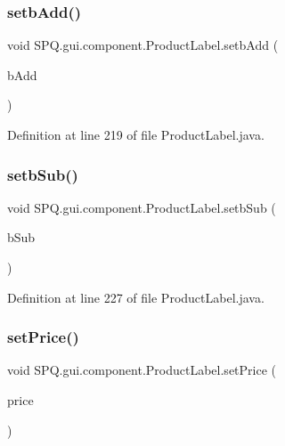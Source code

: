 \subsubsection{\texorpdfstring{setb\+Add()}{setbAdd()}}
{\footnotesize\ttfamily void S\+P\+Q.\+gui.\+component.\+Product\+Label.\+setb\+Add (\begin{DoxyParamCaption}\item[{J\+Button}]{b\+Add }\end{DoxyParamCaption})}



Definition at line 219 of file Product\+Label.\+java.

\mbox{\label{class_s_p_q_1_1gui_1_1component_1_1_product_label_a1d3899db7326042feaa04a482a86ee8e}} 
\subsubsection{\texorpdfstring{setb\+Sub()}{setbSub()}}
{\footnotesize\ttfamily void S\+P\+Q.\+gui.\+component.\+Product\+Label.\+setb\+Sub (\begin{DoxyParamCaption}\item[{J\+Button}]{b\+Sub }\end{DoxyParamCaption})}



Definition at line 227 of file Product\+Label.\+java.

\mbox{\label{class_s_p_q_1_1gui_1_1component_1_1_product_label_a85cc995e0b174583ec6eb7ff075d0f46}} 
\subsubsection{\texorpdfstring{set\+Price()}{setPrice()}}
{\footnotesize\ttfamily void S\+P\+Q.\+gui.\+component.\+Product\+Label.\+set\+Price (\begin{DoxyParamCaption}\item[{J\+Label}]{price }\end{DoxyParamCaption})}



